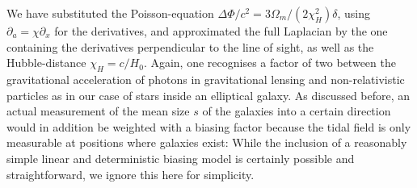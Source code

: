 \documentclass[a4paper,fleqn,usenatbib]{mnras}
\begin{document}
We have substituted the Poisson-equation $\Delta\Phi/c^2 = 3\Omega_m/(2\chi_H^2)\delta$, using $\partial_a = \chi\partial_x$ for the derivatives, and approximated the full Laplacian by the one containing the derivatives perpendicular to the line of sight, as well as the Hubble-distance $\chi_H = c/H_0$. Again, one recognises a factor of two between the gravitational acceleration of photons in gravitational lensing and non-relativistic particles as in our case of stars inside an elliptical galaxy. As discussed before, an actual measurement of the mean size $s$ of the galaxies into a certain direction would in addition be weighted with a biasing factor because the tidal field is only measurable at positions where galaxies exist: While the inclusion of a reasonably simple linear and deterministic biasing model is certainly possible and straightforward, we ignore this here for simplicity. 
\end{document}
